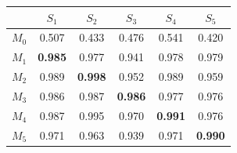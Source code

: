 \begin{tabular}{lccccc}
\toprule
 & $S_1$ & $S_2$ & $S_3$ & $S_4$ & $S_5$ \\
\midrule
$M_0$ & 0.507 & 0.433 & 0.476 & 0.541 & 0.420 \\
\midrule
$M_1$ & \textbf{0.985} & 0.977 & 0.941 & 0.978 & 0.979 \\
$M_2$ & 0.989 & \textbf{0.998} & 0.952 & 0.989 & 0.959 \\
$M_3$ & 0.986 & 0.987 & \textbf{0.986} & 0.977 & 0.976 \\
$M_4$ & 0.987 & 0.995 & 0.970 & \textbf{0.991} & 0.976 \\
$M_5$ & 0.971 & 0.963 & 0.939 & 0.971 & \textbf{0.990} \\
\bottomrule
\end{tabular}
